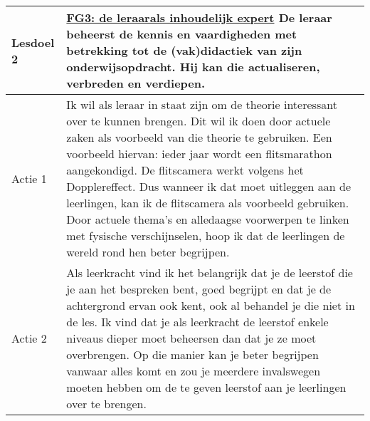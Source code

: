 \vspace{0.5cm}
\begin{tabularx}{\textwidth}{|p{}|p{}|}
	\hline
	\textbf{Lesdoel 2} & \underline{FG3: de leraarals inhoudelijk expert} \newline\newline 3.3 De leraar beheerst de kennis en vaardigheden met betrekking tot de (vak)didactiek van zijn onderwijsopdracht. Hij kan die  actualiseren, verbreden en verdiepen. \\ \hline
	Actie 1 & Ik wil als leraar in staat zijn om de theorie interessant over te kunnen brengen. Dit wil ik doen door actuele zaken als voorbeeld van die theorie te gebruiken. Een voorbeeld hiervan: ieder jaar wordt een flitsmarathon aangekondigd. De flitscamera werkt volgens het Dopplereffect. Dus wanneer ik dat moet uitleggen aan de leerlingen, kan ik de flitscamera als voorbeeld gebruiken. Door actuele thema's en alledaagse voorwerpen te linken met fysische verschijnselen, hoop ik dat de leerlingen de wereld rond hen beter begrijpen. \\ \hline
	Actie 2 & Als leerkracht vind ik het belangrijk dat je de leerstof die je aan het bespreken bent, goed begrijpt en dat je de achtergrond ervan ook kent, ook al behandel je die niet in de les. Ik vind dat je als leerkracht de leerstof enkele niveaus dieper moet beheersen dan dat je ze moet overbrengen. Op die manier kan je beter begrijpen vanwaar alles komt en zou je meerdere invalswegen moeten hebben om de te geven leerstof aan je leerlingen over te brengen. \\ \hline
\end{tabularx}


